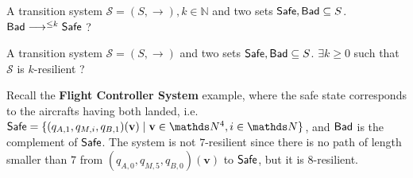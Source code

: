 {A transition system $\mathscr{S}=(S,\rightarrow), k \in \mathbb{N}$ and two sets $\Safe, \Bad \subseteq S$.}
{$\Bad \longrightarrow^{\leq k} \Safe$ ?\newline}

{A transition system $\mathscr{S}=(S,\rightarrow)$ and two sets $\Safe, \Bad \subseteq S$.}
{$\exists k \geq 0$ such that $\mathscr{S}$ is %
 $k$-resilient ?\newline}


\iffalse

\problemx{Resilience problems}
{A transition system $\mathscr{S}=(S,\rightarrow)$, two sets $\Safe, \Bad \subseteq S$, $k \in \mathbb{N}$.}
{ ({\sc resilience problem (RP)}) $\Bad \longrightarrow^{*} \Safe$ ?\newline  
({\sc $k$-resilience problem (kRP)})		$\Bad \longrightarrow^{\leq k} \Safe$ ?\newline
({\sc bounded resilience problem (BRP)})	$\exists k \geq 0$ such that $\mathscr{S}$ is 
 $k$-resilient ?\newline}

\fi


Recall the {\bf Flight Controller System} example, where the safe state corresponds to the aircrafts having both landed, i.e.
$\Safe = \{(q_{A,1}, q_{M,i}, q_{B,1})(\textbf{v}) \mid \textbf{v} \in \N^4, i \in \N\}$,
and $\Bad$ is the complement of $\Safe$. 
The system is not $7$-resilient since there is no path of length smaller than $7$ from $(q_{A,0}, q_{M,5}, q_{B,0})(\textbf{v})$ to $\Safe$, but it is $8$-resilient.

\iffalse
\begin{example}
Let us consider a VASS with only one state $q$, one counter, and one transition that substracts $-1$ from the counter, with $\Safe = \downarrow q(0)$, $\Bad = \uparrow q(1)$,
then resilience hold but not bounded resilience: for every bound $k$ there is an element of $\Bad$ e.g. $q(k+1)$ which necessitate at least $k+1$ steps before it can reach $\Safe$. 
\end{example}
\fi


